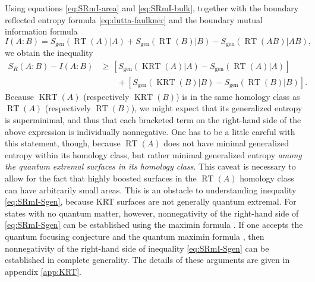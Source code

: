 \documentclass[a4paper,11pt]{article}
\newcommand{\RT}{\operatorname{RT}}
\newcommand{\KRT}{\operatorname{KRT}}
\begin{document}
Using equations \eqref{eq:SRmI-area} and \eqref{eq:SRmI-bulk}, together with the boundary reflected entropy formula \eqref{eq:dutta-faulkner} and the boundary mutual information formula
\begin{equation}
    I(A:B) = S_{\text{gen}}(\RT(A)|A) + S_{\text{gen}}(\RT(B)|B) - S_{\text{gen}}(\RT(AB)|AB),
\end{equation}
we obtain the inequality
\begin{align} \label{eq:SRmI-Sgen}
    S_R(A:B) - I(A:B)
        & \geq \, [S_{\text{gen}}(\KRT(A)|A) - S_{\text{gen}}(\RT(A)|A)] \nonumber \\
               & \qquad + [S_{\text{gen}}(\KRT(B)|B) - S_{\text{gen}}(\RT(B)|B)].
\end{align}
Because $\KRT(A)$ (respectively $\KRT(B)$) is in the same homology class as $\RT(A)$ (respectively $\RT(B)$), we might expect that its generalized entropy is superminimal, and thus that each bracketed term on the right-hand side of the above expression is individually nonnegative. One has to be a little careful with this statement, though, because $\RT(A)$ does not have minimal generalized entropy within its homology class, but rather minimal generalized entropy \emph{among the quantum extremal surfaces in its homology class}. This caveat is necessary to allow for the fact that highly boosted surfaces in the $\RT(A)$ homology class can have arbitrarily small areas. This is an obstacle to understanding inequality \eqref{eq:SRmI-Sgen}, because KRT surfaces are not generally quantum extremal. For states with no quantum matter, however, nonnegativity of the right-hand side of \eqref{eq:SRmI-Sgen} can be established using the maximin formula \cite{maximin}. If one accepts the quantum focusing conjecture \cite{bousso2016quantum} and the quantum maximin formula \cite{quantum-maximin}, then nonnegativity of the right-hand side of inequality \eqref{eq:SRmI-Sgen} can be established in complete generality. The details of these arguments are given in appendix \ref{app:KRT}.
\end{document}
